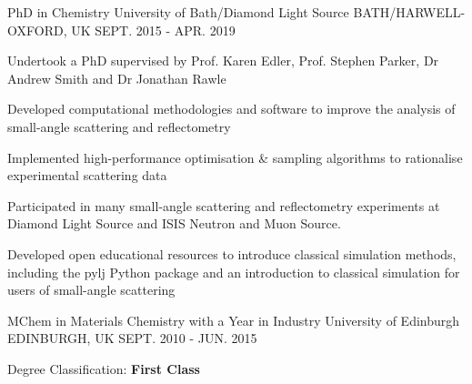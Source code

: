 \begin{cventries}
  \cventry
    {PhD in Chemistry}
    {University of Bath/Diamond Light Source}
    {BATH/HARWELL-OXFORD, UK}
    {SEPT. 2015 - APR. 2019}
    {
      \begin{cvitems}
        \item {Undertook a PhD supervised by Prof. Karen Edler, Prof. Stephen Parker, Dr Andrew Smith and Dr Jonathan Rawle}
        \item {Developed computational methodologies and software to improve the analysis of small-angle scattering and reflectometry}
        \item {Implemented high-performance optimisation \& sampling algorithms to rationalise experimental scattering data}
        \item {Participated in many small-angle scattering and reflectometry experiments at Diamond Light Source and ISIS Neutron and Muon Source.}
        \item {Developed open educational resources to introduce classical simulation methods, including the pylj Python package and an introduction to classical simulation for users of small-angle scattering}
      \end{cvitems}
    }
  \cventry
    {MChem in Materials Chemistry with a Year in Industry}
    {University of Edinburgh}
    {EDINBURGH, UK}
    {SEPT. 2010 - JUN. 2015}
    {
      \begin{cvitems}
        \item {Degree Classification: \textbf{First Class}}
      \end{cvitems}
    }
\end{cventries}
